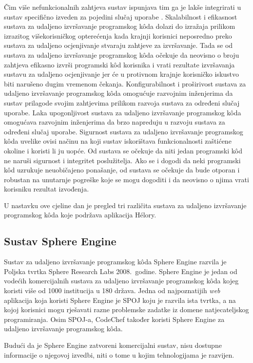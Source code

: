 \documentclass[times, utf8, diplomski]{fer}
\begin{document}
Čim više nefunkcionalnih zahtjeva sustav ispunjava tim ga je lakše integrirati u sustav specifično izveden za pojedini slučaj uporabe \citep{9245310}. Skalabilnost i efikasnost sustava za udaljeno izvršavanje programskog kôda dolazi do izražaja prilikom izrazitog višekorisničkog opterećenja kada krajnji korisnici neposredno preko sustava za udaljeno ocjenjivanje stvaraju zahtjeve za izvršavanje. Tada se od sustava za udaljeno izvršavanje programskog kôda očekuje da neovisno o broju zahtjeva efikasno izvrši programski kôd korisnika i vrati rezultate izvršavanja sustavu za udaljeno ocjenjivanje jer će u protivnom krajnje korisničko iskustvo biti narušeno dugim vremenom čekanja. Konfigurabilnost i proširivost sustava za udaljeno izvršavanje programskog kôda omogućuje razvojnim inženjerima da sustav prilagode svojim zahtjevima prilikom razvoja sustava za određeni slučaj uporabe. Laka upogonljivost sustava za udaljeno izvršavanje programskog kôda omogućava razvojnim inženjerima da brzo napreduju u razvoju sustava za određeni slučaj uporabe. Sigurnost sustava za udaljeno izvršavanje programskog kôda uvelike ovisi načinu na koji sustav iskorištava funkcionalnosti zaštićene okoline i koristi li ju uopće. Od sustava se očekuje da niti jedan programski kôd ne naruši sigurnost i integritet poslužitelja. Ako se i dogodi da neki programski kôd uzrukuje neuobičajeno ponašanje, od sustava se očekuje da bude otporan i robustan na unutarnje pogreške koje se mogu dogoditi i da neovisno o njima vrati korisniku rezultat izvođenja.

U nastavku ove cjeline dan je pregled tri različita sustava za udaljeno izvršavanje programskog kôda koje podržava aplikacija Hélory.

\subsection{Sustav Sphere Engine}
Sustav za udaljeno izvršavanje programskog kôda Sphere Engine razvila je Poljska tvrtka Sphere Research Labs 2008.\ godine. Sphere Engine je jedan od vodećih komercijalnih sustava za udaljeno izvršavanje programskog kôda kojeg koristi više od 1000 institucija u 180 država. Jedna od najpoznatijih \textit{web} aplikacija koja koristi Sphere Engine je SPOJ \citep{SPOJ} koju je razvila ista tvrtka, a na kojoj korisnici mogu rješavati razne problemske zadatke iz domene natjecateljskog programiranja. Osim SPOJ-a, CodeChef \citep{CodeChef} također koristi Sphere Engine za udaljeno izvršavanje programskog kôda.

Budući da je Sphere Engine zatvoreni komercijalni sustav, nisu dostupne informacije o njegovoj izvedbi, niti o tome u kojim tehnologijama je razvijen.
\end{document}
